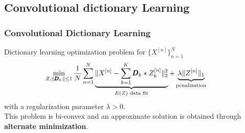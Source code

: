\documentclass[prez_tpt]{subfiles}
\begin{document}
\subsection{Convolutional dictionary Learning}
\begin{frame}[t]
\frametitle{Convolutional Dictionary Learning}
Dictionary learning optimization problem for $\{X^{[n]}\}_{n=1}^N$ 
\[\hskip-2em\begin{split}
 \min_{Z, \|\pmb D_k\|\le 1}\frac{1}{N}\sum_{n=1}^N
			\underbrace{\| X^{[n]} - \sum_{k=1}^K\pmb D_k *  Z_k^{[n]}\|_2^2
						}_{E(Z) \text{ data fit}}
			+ \underbrace{\lambda\| Z^{[n]}\|_1
						}_{\text{penalization}}
\end{split}\]
with a regularization parameter $\lambda > 0$.\\[1.5em]
This problem is bi-convex and an approximate solution is obtained through \textbf{alternate minimization}. 
\end{frame}

\end{document}
